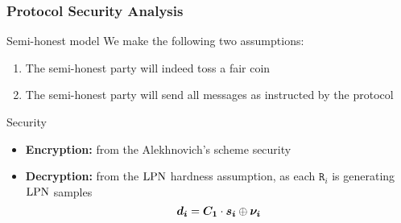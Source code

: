 \begin{frame}
 \frametitle{Protocol Security Analysis }

  \begin{block}{Semi-honest model}
    We make the following two assumptions:
    \begin{enumerate}
      \item The semi-honest party will indeed toss a fair coin
      \item The semi-honest party will send all messages as instructed by the protocol
    \end{enumerate}
  \end{block}

  \begin{block}{Security}
  \begin{itemize}
    \item \textbf{Encryption:} from the Alekhnovich's scheme security
    \item \textbf{Decryption:} from the $\mathrm{LPN}$ hardness assumption, as each $\mathtt{R}_i$ is generating $\mathrm{LPN}$ samples
    \[
     \boldsymbol{d_i} = \boldsymbol{C_1} \cdot \boldsymbol{s_i} \mathbin{\oplus} \boldsymbol{\nu_{i}} 
    \]

  \end{itemize}
  \end{block}
  
\end{frame}
